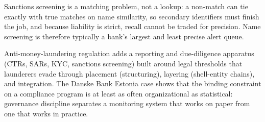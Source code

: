 \documentclass[../ai_in_finance]{subfiles}
\begin{document}
Sanctions screening is a matching problem, not a lookup: a non-match can tie exactly with true matches on name similarity, so secondary identifiers must finish the job, and because liability is strict, recall cannot be traded for precision. Name screening is therefore typically a bank's largest and least precise alert queue.

Anti-money-laundering regulation adds a reporting and due-diligence apparatus (CTRs, SARs, KYC, sanctions screening) built around legal thresholds that launderers evade through placement (structuring), layering (shell-entity chains), and integration. The Danske Bank Estonia case shows that the binding constraint on a compliance program is at least as often organizational as statistical: governance discipline separates a monitoring system that works on paper from one that works in practice.

\end{document}

